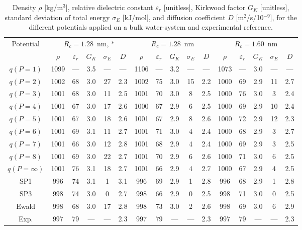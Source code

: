 \documentclass[
journal=jctcce,
manuscript=letter]{achemso}
\begin{document}
\begin{table}[t]
    \centering
    \begin{tabular}{ c | c c c | c c | c c c | c c | c c c | c c |}
    \multirow{2}{*}{Potential} & \multicolumn{5}{c|}{$R_c=1.28$~nm, $*$} & \multicolumn{5}{c|}{$R_c=1.28$~nm} & \multicolumn{5}{c|}{$R_c=1.60$~nm} \\ & $\rho$ & $\varepsilon_r$ & $G_K$ & $\sigma_E$ & $D$ & $\rho$ & $\varepsilon_r$ & $G_K$ & $\sigma_E$ & $D$ & $\rho$ & $\varepsilon_r$ & $G_K$ & $\sigma_E$ & $D$ \\\hline
    $q(P=1)$ & 1099 & --- & 3.5 & --- & --- & 1106 & ---  & 3.2 & --- & --- & 1073 & --- & 3.0 & --- & --- \\
    $q(P=2)$ & 1002 & 68 & 3.0 & 27 & 2.3 & 1002 & 75 & 3.0 & 15 & 2.2 & 1000 & 69 & 2.9 & 11 & 2.7 \\
    $q(P=3)$ & 1001 & 68 & 3.0 & 11 & 2.5 & 1001 & 70 & 3.0 & 8 & 2.5 & 1000 & 76 & 3.0 & 3 & 2.4 \\
    $q(P=4)$ & 1001 & 67 & 3.0 & 17 & 2.6 & 1000 & 67 & 2.9 & 6 & 2.5 & 1000 & 69 & 2.9 & 10 & 2.4 \\
    $q(P=5)$ & 1001 & 67 & 3.0 & 18 & 2.6 & 1001 & 67 & 2.9 & 8 & 2.6 & 1000 & 72 & 2.9 & 12 & 2.3 \\
    $q(P=6)$ & 1001 & 69 & 3.1 & 11 & 2.7 & 1001 & 71 & 3.0 & 4 & 2.4 & 1000 & 68 & 2.9 & 3 & 2.7 \\
    $q(P=7)$ & 1001 & 66 & 3.0 & 12 & 2.8 & 1001 & 68 & 2.9 & 4 & 2.4 & 1000 & 69 & 2.9 & 3 & 2.5 \\
    $q(P=8)$ & 1001 & 69 & 3.0 & 22 & 2.7 & 1001 & 70 & 2.9 & 6 & 2.6 & 1000 & 71 & 3.0 & 6 & 2.5 \\
    $q(P=\infty)$ & 1001 & 76 & 3.1 & 18 & 2.7 & 1001 & 66 & 2.9 & 4 & 2.7 & 1000 & 67 & 2.9 & 4 & 2.5 \\\hline
    SP1 &   996 & 74 & 3.1 & 1 & 3.1 &   996 & 69 & 2.9 & 1 & 2.8 &   996 & 68 & 2.9 & 1 & 2.8\\
    SP3 &   998 & 74 & 3.0 & 0 & 2.7 &   998 & 66 & 2.9 & 0 & 2.5 &   998 & 71 & 3.0 & 0 & 2.5 \\\hline
    Ewald & 998 & 68 & 3.0 & 17 & 2.8 & 998 & 73 & 3.0 & 2 & 2.6 & 998 & 69 & 3.0 & 6 & 2.9 \\
    \hline
    Exp. & 997 & 79 & --- & --- & 2.3 & 997 & 79 & --- & --- & 2.3 & 997 & 79 & --- & --- & 2.3 \\
    \end{tabular}
    \caption{Density $\rho$ [kg/m$^3$], relative dielectric constant $\varepsilon_r$ [unitless], Kirkwood factor $G_K$ [unitless], standard deviation of total energy $\sigma_E$ [kJ/mol], and diffusion coefficient $D$ [m$^2$/s/10$^{-9}$], for the different potentials applied on a bulk water-system and experimental reference\cite{harned1958physical,Mills1973Self}.}
    \label{tbl:denteSI}
\end{table}


\end{document}
